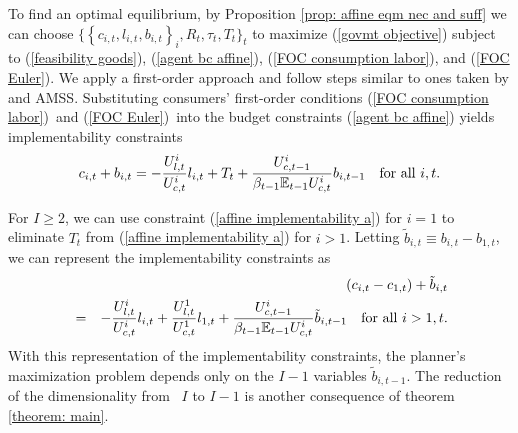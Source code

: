 \documentclass[thmsb,11pt]{article}
\begin{document}
To find an optimal equilibrium, by Proposition  \ref{prop: affine eqm nec and suff}
we can choose $\{ \left \{ c_{i,t},l_{i,t},b_{i,t}\right \} _{i},R_{t},\tau
_{t},T_{t}\}_{t}$ to maximize (\ref{govmt objective}) subject to (\ref{feasibility goods}), (\ref{agent bc affine}), (\ref{FOC consumption labor}), and (\ref{FOC Euler}).
We  apply a first-order approach and follow steps similar to ones taken by \cite{LucasJr.1983} and AMSS.
 Substituting consumers' first-order
conditions (\ref{FOC consumption labor})\ and (\ref{FOC Euler})\ into the
budget constraints (\ref{agent bc affine}) yields implementability
constraints%
\begin{equation}
c_{i,t}+b_{i,t}=-\frac{U_{l,t}^{i}}{U_{c,t}^{i}}l_{i,t}+T_{t}+\frac{%
U_{c,t-1}^{i}}{\beta_{t-1} \mathbb{E}_{t-1}U_{c,t}^{i}}b_{i,t-1}\ \text{for\ all\ }%
i,t.  \label{affine implementability a}
\end{equation}

\noindent For $I\geq 2$, we can use constraint (\ref{affine implementability
a}) for  $i=1$ to eliminate $T_{t}$ from (\ref{affine implementability a}) for $i > 1$. Letting $\tilde{b}%
_{i,t}\equiv b_{i,t}-b_{1,t}$, we can represent the implementability constraints
as
\begin{eqnarray}
&&\left( c_{i,t}-c_{1,t}\right) +\tilde{b}_{i,t}
\label{affine implementability b} \\
&=&-\frac{U_{l,t}^{i}}{U_{c,t}^{i}}l_{i,t}+\frac{U^1_{l,t}}{U^1_{c,t}}l_{1,t} +\frac{U_{c,t-1}^{i}}{\beta_{t-1} \mathbb{E}%
_{t-1}U_{c,t}^{i}}\tilde{b}_{i,t-1}\ \text{for\ all\ }i>1,t.  \notag
\end{eqnarray}
\noindent With this representation of the implementability constraints, the planner's
maximization problem depends only on the $I-1$ variables $\tilde{b}_{i,t-1}.$
The reduction of  the dimensionality from \ $I$ to $I-1$ is
 another consequence of theorem \ref{theorem: main}.
\end{document}
